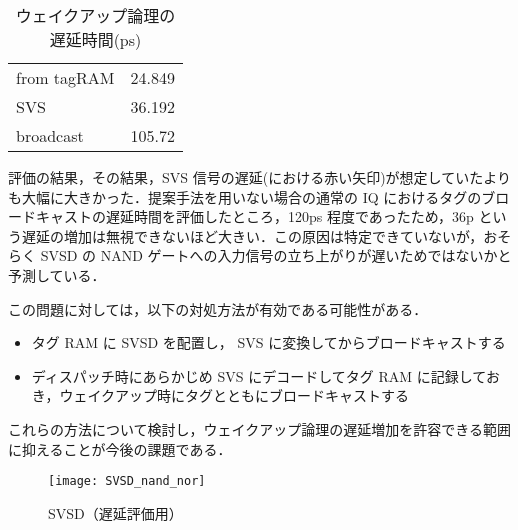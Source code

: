   \begin{table}[htb]
    \caption{ウェイクアップ論理の遅延時間(ps)}
    \footnotesize
    \center
      \begin{tabular}{l|l} \hline \hline
       from tagRAM & 24.849 \\
       SVS & 36.192 \\
       broadcast & 105.72 \\ \hline
    \end{tabular}
    \label{tab:delay}
  \end{table}

  評価の結果，その結果，SVS 信号の遅延(における赤い矢印)が想定していたよりも大幅に大きかった．提案手法を用いない場合の通常の IQ におけるタグのブロードキャストの遅延時間を評価したところ，120ps 程度であったため，36p という遅延の増加は無視できないほど大きい．この原因は特定できていないが，おそらく SVSD の NAND ゲートへの入力信号の立ち上がりが遅いためではないかと予測している．

  この問題に対しては，以下の対処方法が有効である可能性がある．
  \begin{itemize}
  \item タグ RAM に SVSD を配置し， SVS に変換してからブロードキャストする
  \item ディスパッチ時にあらかじめ SVS にデコードしてタグ RAM に記録しておき，ウェイクアップ時にタグとともにブロードキャストする
  \end{itemize}
  これらの方法について検討し，ウェイクアップ論理の遅延増加を許容できる範囲に抑えることが今後の課題である．
  
\begin{figure}[htb]
  \centering
  \texttt{[image: SVSD\_nand\_nor]}
  \caption{SVSD（遅延評価用）}
  \label{fig:SVSD_nand_nor}
\end{figure}
